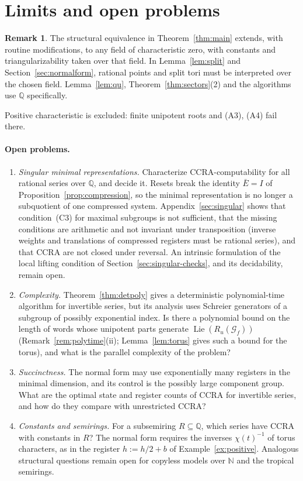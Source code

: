 \documentclass[11pt,letterpaper]{article}
\newcommand{\Q}{\mathbb{Q}}
\newcommand{\N}{\mathbb{N}}
\newcommand{\cG}{\mathcal{G}}
\theoremstyle{definition}
\newtheorem{remark}[theorem]{Remark}
\begin{document}
\section{Limits and open problems}\label{sec:open}
\begin{remark} The structural equivalence in Theorem~\ref{thm:main} extends, with routine modifications, to any field of characteristic zero, with constants and triangularizability taken over that field. In Lemma~\ref{lem:split} and Section~\ref{sec:normalform}, rational points and split tori must be interpreted over the chosen field. Lemma~\ref{lem:qu}, Theorem~\ref{thm:sectors}(2) and the algorithms use $\Q$ specifically. \end{remark} Positive characteristic is excluded: finite unipotent roots and (A3), (A4) fail there.

\paragraph{Open problems.}
\begin{enumerate}
\item \emph{Singular minimal representations.} Characterize CCRA-computability for all rational series over $\Q$, and decide it. Resets break the identity $\bar E=I$ of Proposition~\ref{prop:compression}, so the minimal representation is no longer a subquotient of one compressed system. Appendix~\ref{sec:singular} shows that condition~(C3) for maximal subgroups is not sufficient, that the missing conditions are arithmetic and not invariant under transposition (inverse weights and translations of compressed registers must be rational series), and that CCRA are not closed under reversal. An intrinsic formulation of the local lifting condition of Section~\ref{sec:singular-checks}, and its decidability, remain open.
\item \emph{Complexity.} Theorem~\ref{thm:detpoly} gives a deterministic polynomial-time algorithm for invertible series, but its analysis uses Schreier generators of a subgroup of possibly exponential index. Is there a polynomial bound on the length of words whose unipotent parts generate $\operatorname{Lie}(R_u(\cG_f))$ (Remark~\ref{rem:polytime}(ii); Lemma~\ref{lem:torus} gives such a bound for the torus), and what is the parallel complexity of the problem?
\item \emph{Succinctness.} The normal form may use exponentially many registers in the minimal dimension, and its control is the possibly large component group. What are the optimal state and register counts of CCRA for invertible series, and how do they compare with unrestricted CCRA?
\item \emph{Constants and semirings.} For a subsemiring $R\subseteq\Q$, which series have CCRA with constants in $R$? The normal form requires the inverses $\chi(t)^{-1}$ of torus characters, as in the register $h:=h/2+b$ of Example~\ref{ex:positive}. Analogous structural questions remain open for copyless models over $\N$ and the tropical semirings.
\end{enumerate}
\end{document}
